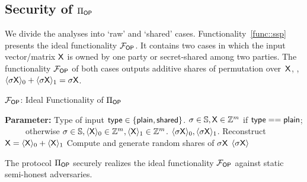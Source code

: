 \subsection{Security of \texorpdfstring{$\Pi_{\mathsf{OP}}$}{πOP}}
\label{sec::detail_op}

We divide the analyses into `raw' and `shared' cases.
Functionality~\ref{func::ssp} presents the ideal functionality $\mathcal{F}_{\mathsf{OP}}$.
It contains two cases in which the input vector/matrix $\mathsf{X}$ is owned by one party or secret-shared among two parties.
The functionality $\mathcal{F}_{\mathsf{OP}}$ of both cases outputs additive shares of permutation over~$\mathsf{X}$, \ie, $\langle \sigma\mathsf{X}\rangle_0 +\langle \sigma\mathsf{X}\rangle_1 =\sigma\mathsf{X}$.

\setcounter{algorithm}{0}

\begin{functionality}[!t]
	\caption{$\mathcal{F}_{\mathsf{OP}}$: Ideal Functionality of $\Pi_{\mathsf{OP}}$}\label{func::ssp} 
\begin{algorithmic}[1]
	\item[\textbf{Parameter:} Type of input $\mathsf{type} \in \{\mathsf{plain}, \mathsf{shared}\}$.]
	\REQUIRE $\sigma\in\mathbb{S},\mathsf{X}\in \mathbb{Z}^m$ if $\mathsf{type} == \mathsf{plain}$; \\ ~~~~~otherwise $\sigma\in \mathbb{S},\langle\mathsf{X}\rangle_0\in\mathbb{Z}^m, \langle\mathsf{X}\rangle_1\in\mathbb{Z}^m$.
	\ENSURE $\langle \sigma\mathsf{X}\rangle_0,\langle \sigma\mathsf{X}\rangle_1$.
	\IF{$\type == \shared$} 
	\STATE Reconstruct $\mathsf{X} = \langle \mathsf{X} \rangle_0+\langle \mathsf{X} \rangle_1$
	\ENDIF
	\STATE Compute and generate random shares of $\sigma\mathsf{X}$
	\RETURN $\langle \sigma\mathsf{X} \rangle$
\end{algorithmic}
\end{functionality}

\begin{theorem}
\label{the::ssp}
	The protocol $\Pi_{\mathsf{OP}}$ securely realizes the ideal functionality $\mathcal{F}_{\mathsf{OP}}$ against static semi-honest adversaries.
\end{theorem}
 
